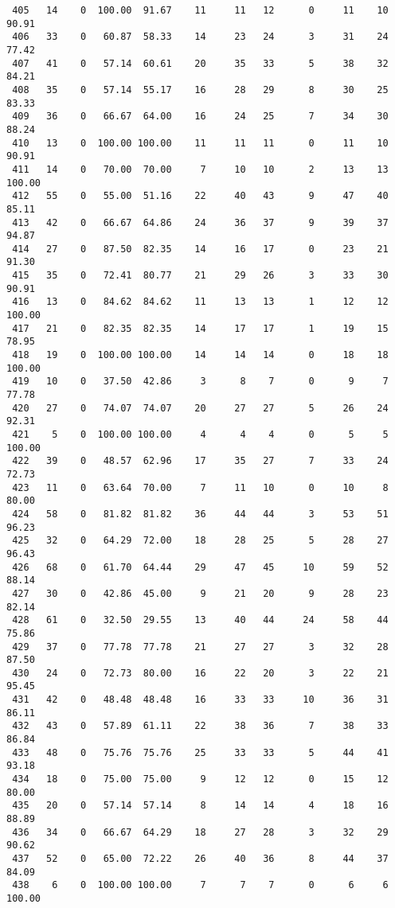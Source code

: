 \begin{verbatim}
 405   14    0  100.00  91.67    11     11   12      0     11    10    90.91
 406   33    0   60.87  58.33    14     23   24      3     31    24    77.42
 407   41    0   57.14  60.61    20     35   33      5     38    32    84.21
 408   35    0   57.14  55.17    16     28   29      8     30    25    83.33
 409   36    0   66.67  64.00    16     24   25      7     34    30    88.24
 410   13    0  100.00 100.00    11     11   11      0     11    10    90.91
 411   14    0   70.00  70.00     7     10   10      2     13    13   100.00
 412   55    0   55.00  51.16    22     40   43      9     47    40    85.11
 413   42    0   66.67  64.86    24     36   37      9     39    37    94.87
 414   27    0   87.50  82.35    14     16   17      0     23    21    91.30
 415   35    0   72.41  80.77    21     29   26      3     33    30    90.91
 416   13    0   84.62  84.62    11     13   13      1     12    12   100.00
 417   21    0   82.35  82.35    14     17   17      1     19    15    78.95
 418   19    0  100.00 100.00    14     14   14      0     18    18   100.00
 419   10    0   37.50  42.86     3      8    7      0      9     7    77.78
 420   27    0   74.07  74.07    20     27   27      5     26    24    92.31
 421    5    0  100.00 100.00     4      4    4      0      5     5   100.00
 422   39    0   48.57  62.96    17     35   27      7     33    24    72.73
 423   11    0   63.64  70.00     7     11   10      0     10     8    80.00
 424   58    0   81.82  81.82    36     44   44      3     53    51    96.23
 425   32    0   64.29  72.00    18     28   25      5     28    27    96.43
 426   68    0   61.70  64.44    29     47   45     10     59    52    88.14
 427   30    0   42.86  45.00     9     21   20      9     28    23    82.14
 428   61    0   32.50  29.55    13     40   44     24     58    44    75.86
 429   37    0   77.78  77.78    21     27   27      3     32    28    87.50
 430   24    0   72.73  80.00    16     22   20      3     22    21    95.45
 431   42    0   48.48  48.48    16     33   33     10     36    31    86.11
 432   43    0   57.89  61.11    22     38   36      7     38    33    86.84
 433   48    0   75.76  75.76    25     33   33      5     44    41    93.18
 434   18    0   75.00  75.00     9     12   12      0     15    12    80.00
 435   20    0   57.14  57.14     8     14   14      4     18    16    88.89
 436   34    0   66.67  64.29    18     27   28      3     32    29    90.62
 437   52    0   65.00  72.22    26     40   36      8     44    37    84.09
 438    6    0  100.00 100.00     7      7    7      0      6     6   100.00

\end{verbatim}
